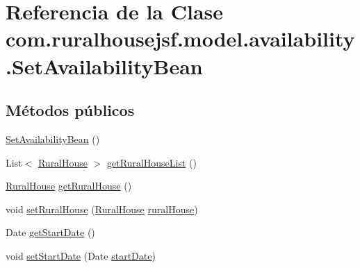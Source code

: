 \hypertarget{classcom_1_1ruralhousejsf_1_1model_1_1availability_1_1_set_availability_bean}{}\section{Referencia de la Clase com.\+ruralhousejsf.\+model.\+availability.\+Set\+Availability\+Bean}
\label{classcom_1_1ruralhousejsf_1_1model_1_1availability_1_1_set_availability_bean}
\subsection*{Métodos públicos}
\begin{DoxyCompactItemize}
\item 
\mbox{\hyperlink{classcom_1_1ruralhousejsf_1_1model_1_1availability_1_1_set_availability_bean_a5eb9c427878e584a4850a8f48fcdbdb7}{Set\+Availability\+Bean}} ()
\item 
List$<$ \mbox{\hyperlink{classcom_1_1ruralhousejsf_1_1domain_1_1_rural_house}{Rural\+House}} $>$ \mbox{\hyperlink{classcom_1_1ruralhousejsf_1_1model_1_1availability_1_1_set_availability_bean_ad3d70e71d8eef84be13608ebdc45daa0}{get\+Rural\+House\+List}} ()
\item 
\mbox{\hyperlink{classcom_1_1ruralhousejsf_1_1domain_1_1_rural_house}{Rural\+House}} \mbox{\hyperlink{classcom_1_1ruralhousejsf_1_1model_1_1availability_1_1_set_availability_bean_a6fc1e11639074a665cb2413b6e873004}{get\+Rural\+House}} ()
\item 
void \mbox{\hyperlink{classcom_1_1ruralhousejsf_1_1model_1_1availability_1_1_set_availability_bean_ac299020c526a3c4332cbd4e40b663b40}{set\+Rural\+House}} (\mbox{\hyperlink{classcom_1_1ruralhousejsf_1_1domain_1_1_rural_house}{Rural\+House}} \mbox{\hyperlink{classcom_1_1ruralhousejsf_1_1model_1_1availability_1_1_set_availability_bean_a38f4f2cc1f2c0647c1dea95c3e9c2fea}{rural\+House}})
\item 
Date \mbox{\hyperlink{classcom_1_1ruralhousejsf_1_1model_1_1availability_1_1_set_availability_bean_a6da0cc3c2b9f138bb14fe20706b1d61d}{get\+Start\+Date}} ()
\item 
void \mbox{\hyperlink{classcom_1_1ruralhousejsf_1_1model_1_1availability_1_1_set_availability_bean_a13be2b2f3e792278e1b1b45cdc3c2286}{set\+Start\+Date}} (Date \mbox{\hyperlink{classcom_1_1ruralhousejsf_1_1model_1_1availability_1_1_set_availability_bean_a6962c301508cdd26f40a28468d59009c}{start\+Date}})
\item 

\end{DoxyCompactItemize}
